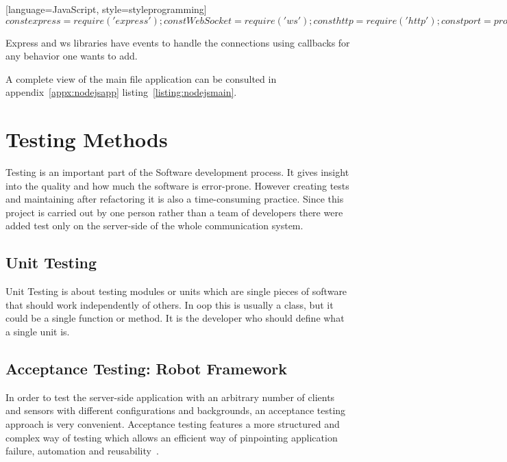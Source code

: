 \documentclass[hidelinks,11pt,a4paper,oneside,article]{memoir}
\begin{document}
[language=JavaScript, style=styleprogramming]$
const express = require('express');
const WebSocket = require('ws');
const http = require('http');

const port = process.env.PORT
const ip = '0.0.0.0';

/* http server */
const express = express();
const server = http.createServer(express);
    // ... handle http requests ...

/* websocket server extends the http server */
var wss = new WebSocket.Server({
    server: server,
    // other websocket configuration ...
});

 wss.on('connection', function connection(ws) {
    // ... handle websocket requests ...
});

server.listen(port, ip);
$

Express and ws libraries have events to handle the connections using callbacks for any behavior one wants to add.

A complete view of the main file application can be consulted in appendix~\ref{appx:nodejsapp} listing~\ref{listing:nodejsmain}.



\section{Testing Methods}
Testing is an important part of the Software development process. It gives insight into the quality and how much the software is error-prone. However creating tests and maintaining after refactoring it is also a time-consuming practice. Since this project is carried out by one person rather than a team of developers there were added test only on the server-side of the whole communication system.

\subsection{Unit Testing}
Unit Testing is about testing modules or units which are single pieces of software that should work independently of others. In \gls{oop} this is usually a class, but it could be a single function or method. It is the developer who should define what a single unit is.
\subsection{Acceptance Testing: Robot Framework}
In order to test the server-side application with an arbitrary number of clients and sensors with different configurations and backgrounds, an acceptance testing approach is very convenient. Acceptance testing features a more structured and complex way of testing which allows an efficient way of pinpointing application failure, automation and reusability~\cite{bisht2013robot}.
\end{document}

